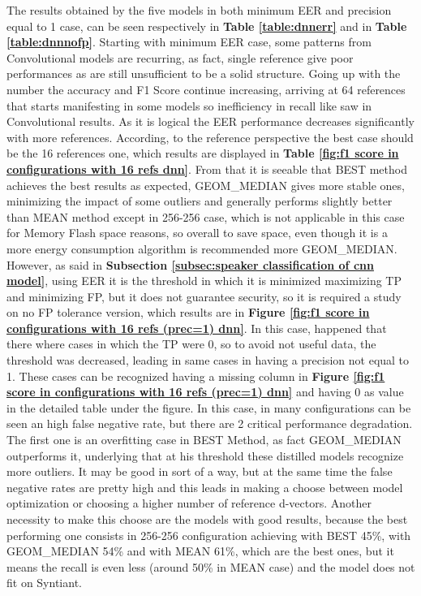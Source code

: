 \newpage
The results obtained by the five models in both minimum EER and precision equal to 1 case, can be seen respectively in \textbf{Table \ref{table:dnnerr}} and in \textbf{Table \ref{table:dnnnofp}}. Starting with minimum EER case, some patterns from Convolutional models are recurring, as fact, single reference give poor performances as are still unsufficient to be a solid structure. Going up with the number the accuracy and F1 Score continue increasing, arriving at 64 references that starts manifesting in some models so inefficiency in recall like saw in Convolutional results. As it is logical the EER performance decreases significantly with more references. According, to the reference perspective the best case should be the 16 references one, which results are displayed in \textbf{Table \ref{fig:f1 score in configurations with 16 refs dnn}}. From that it is seeable that BEST method achieves the best results as expected, GEOM\_MEDIAN gives more stable ones, minimizing the impact of some outliers and generally performs slightly better than MEAN method except in 256-256 case, which is not applicable in this case for Memory Flash space reasons, so overall to save space, even though it is a more energy consumption algorithm is recommended more GEOM\_MEDIAN. However, as said in \textbf{Subsection \ref{subsec:speaker classification of cnn model}}, using EER it is the threshold in which it is minimized maximizing TP and minimizing FP, but it does not guarantee security, so it is required a study on no FP tolerance version, which results are in \textbf{Figure \ref{fig:f1 score in configurations with 16 refs (prec=1) dnn}}.
In this case, happened that there where cases in which the TP were 0, so to avoid not useful data, the threshold was decreased, leading in same cases in having a precision not equal to 1. These cases can be recognized having a missing column in \textbf{Figure \ref{fig:f1 score in configurations with 16 refs (prec=1) dnn}} and having 0 as value in the detailed table under the figure. In this case, in many configurations can be seen an high false negative rate, but there are 2 critical performance degradation. 
The first one is an overfitting case in BEST Method, as fact GEOM\_MEDIAN outperforms it, underlying that at his threshold these distilled models recognize more outliers. It may be good in sort of a way, but at the same time the false negative rates are pretty high and this leads in making a choose between model optimization or choosing a higher number of reference d-vectors. 
Another necessity to make this choose are the models with good results, because the best performing one consists in 256-256 configuration achieving with BEST 45\%, with GEOM\_MEDIAN 54\% and with MEAN 61\%, which are the best ones, but it means the recall is even less (around 50\% in MEAN case) and the model does not fit on Syntiant. 
